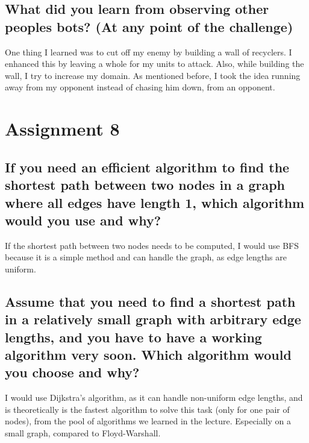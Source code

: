 \documentclass[runningheads]{llncs}
\begin{document}
\subsection*{What did you learn from observing other peoples bots? (At any point of the challenge)}
One thing I learned was to cut off my enemy by building a wall of recyclers. I enhanced this by leaving a whole for my units to attack. Also, while building the wall, I try to increase my domain. As mentioned before, I took the idea running away
from my opponent instead of chasing him down, from an opponent.

\section{Assignment 8}

\subsection*{If you need an efficient algorithm to find the shortest path between two nodes in a graph where all edges have length 1, which algorithm would you use and why?}
If the shortest path between two nodes needs to be computed, I would use BFS because it is a simple method and can handle the graph, as edge lengths are uniform.

\subsection*{Assume that you need to find a shortest path in a relatively small graph with arbitrary edge lengths, and you have to have a working algorithm very soon. Which algorithm would you choose and why?}
I would use Dijkstra's algorithm, as it can handle non-uniform edge lengths, and is theoretically is the fastest algorithm to solve this task (only for one pair of nodes), from the pool of algorithms we learned in the lecture. Especially on a
small graph, compared to Floyd-Warshall.
\end{document}

